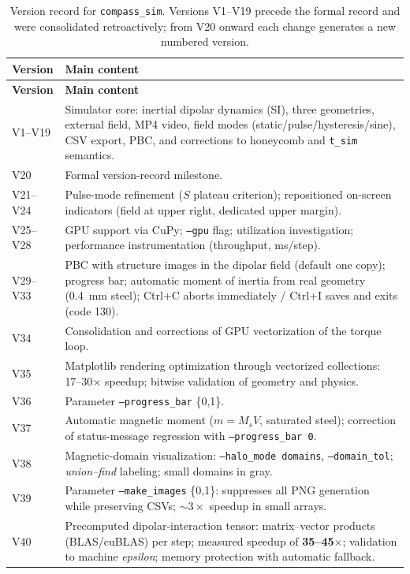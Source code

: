 \documentclass[11pt,a4paper]{article}
\newcommand{\code}[1]{\texttt{#1}}
\begin{document}
\begin{longtable}{@{}lp{11.5cm}@{}}
\caption{Version record for \code{compass\_sim}. Versions V1--V19 precede the formal record and were consolidated retroactively; from V20 onward each change generates a new numbered version.}
\label{tab:versoes} \\
\toprule
\textbf{Version} & \textbf{Main content} \\
\midrule
\endfirsthead
\toprule
\textbf{Version} & \textbf{Main content} \\
\midrule
\endhead
\bottomrule
\endfoot
\bottomrule
\endlastfoot
V1--V19 & Simulator core: inertial dipolar dynamics (SI), three geometries, external field, MP4 video, field modes (static/pulse/hysteresis/sine), CSV export, PBC, and corrections to honeycomb and \code{t\_sim} semantics. \\
V20 & Formal version-record milestone. \\
V21--V24 & Pulse-mode refinement ($S$ plateau criterion); repositioned on-screen indicators (field at upper right, dedicated upper margin). \\
V25--V28 & GPU support via CuPy; \code{--gpu} flag; utilization investigation; performance instrumentation (throughput, ms/step). \\
V29--V33 & PBC with structure images in the dipolar field (default one copy); progress bar; automatic moment of inertia from real geometry (\SI{0.4}{mm} steel); Ctrl+C aborts immediately / Ctrl+I saves and exits (code 130). \\
V34 & Consolidation and corrections of GPU vectorization of the torque loop. \\
V35 & Matplotlib rendering optimization through vectorized collections: 17--30$\times$ speedup; bitwise validation of geometry and physics. \\
V36 & Parameter \code{--progress\_bar} \{0,1\}. \\
V37 & Automatic magnetic moment ($m = M_s V$, saturated steel); correction of status-message regression with \code{--progress\_bar 0}. \\
V38 & Magnetic-domain visualization: \code{--halo\_mode domains}, \code{--domain\_tol}; \emph{union--find} labeling; small domains in gray. \\
V39 & Parameter \code{--make\_images} \{0,1\}: suppresses all PNG generation while preserving CSVs; $\sim 3\times$ speedup in small arrays. \\
V40 & Precomputed dipolar-interaction tensor: matrix--vector products (BLAS/cuBLAS) per step; measured speedup of \textbf{35--45$\times$}; validation to machine \emph{epsilon}; memory protection with automatic fallback. \\

\end{longtable}
\end{document}
